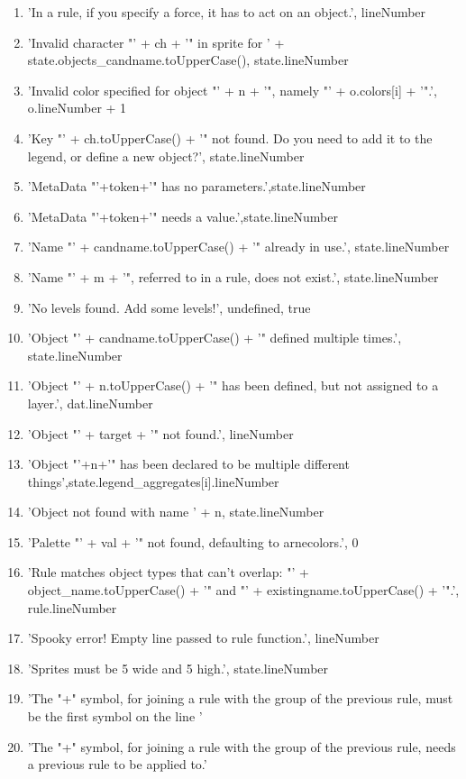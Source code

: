 \begin{enumerate}
    \item 'In a rule, if you specify a force, it has to act on an object.', lineNumber
    \item 'Invalid character "' + ch + '" in sprite for ' + state.objects\_candname.toUpperCase(), state.lineNumber
    \item 'Invalid color specified for object "' + n + '", namely "' + o.colors[i] + '".', o.lineNumber + 1
    \item 'Key "' + ch.toUpperCase() + '" not found. Do you need to add it to the legend, or define a new object?', state.lineNumber
    \item 'MetaData "'+token+'" has no parameters.',state.lineNumber
    \item 'MetaData "'+token+'" needs a value.',state.lineNumber
    \item 'Name "' + candname.toUpperCase() + '" already in use.', state.lineNumber
    \item 'Name "' + m + '", referred to in a rule, does not exist.', state.lineNumber
    \item 'No levels found.  Add some levels!', undefined, true
    \item 'Object "' + candname.toUpperCase() + '" defined multiple times.', state.lineNumber
    \item 'Object "' + n.toUpperCase() + '" has been defined, but not assigned to a layer.', dat.lineNumber
    \item 'Object "' + target + '" not found.', lineNumber
    \item 'Object "'+n+'" has been declared to be multiple different things',state.legend\_aggregates[i].lineNumber
    \item 'Object not found with name ' + n, state.lineNumber
    \item 'Palette "' + val + '" not found, defaulting to arnecolors.', 0
    \item 'Rule matches object types that can't overlap: "' + object\_name.toUpperCase() + '" and "' + existingname.toUpperCase() + '".', rule.lineNumber
    \item 'Spooky error!  Empty line passed to rule function.', lineNumber
    \item 'Sprites must be 5 wide and 5 high.', state.lineNumber
    \item 'The "+" symbol, for joining a rule with the group of the previous rule, must be the first symbol on the line '
    \item 'The "+" symbol, for joining a rule with the group of the previous rule, needs a previous rule to be applied to.'

\end{enumerate}
